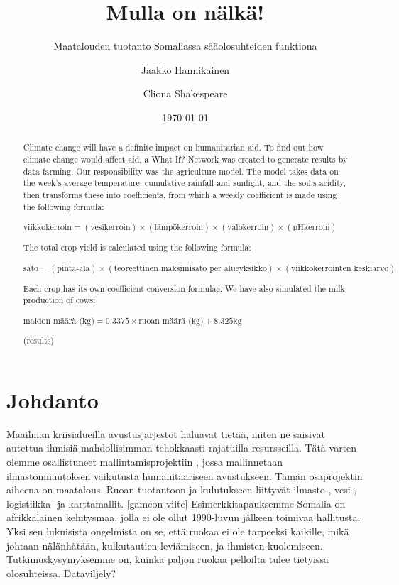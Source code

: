\documentclass[12pt]{scrreprt}
\title{Mulla on nälkä!}
\subtitle{Maatalouden tuotanto Somaliassa sääolosuhteiden funktiona}
\author{Jaakko Hannikainen \and Cliona Shakespeare}
\date{\today}
\begin{document}
  \maketitle

  \begin{abstract}
    Climate change will have a definite impact on humanitarian aid. To find out how climate change would affect aid, a What If? Network was created to generate results by data farming. Our responsibility was the agriculture model.
The model takes data on the week's average temperature, cumulative rainfall and sunlight, and the soil's acidity, then transforms these into coefficients, from which a weekly coefficient is made using the following formula:
  \begin{em}
  $ \text{viikkokerroin} = (\text{vesikerroin}) \times (\text{lämpökerroin})
  \times (\text{valokerroin}) \times (\text{pHkerroin}) $\end{em}

The total crop yield is calculated using the following formula:
  \begin{em}
  $ \text{sato} = (\text{pinta-ala}) \times (\text{teoreettinen maksimisato per
  alueyksikko}) \times (\text{viikkokerrointen keskiarvo}) $\end{em}

Each crop has its own coefficient conversion formulae.
We have also simulated the milk production of cows:
\begin{em}
  $ \text{maidon määrä (kg)} = 0.3375 \times \text{ruoan määrä (kg)}
  + 8.325\text{kg} $ \end{em}

(results)
  \end{abstract}

  \tableofcontents

  \chapter{Johdanto}

  
  Maailman kriisialueilla avustusjärjestöt haluavat tietää, miten ne saisivat 
  autettua ihmisiä mahdollisimman tehokkaasti rajatuilla resursseilla. Tätä 
  varten olemme osallistuneet mallintamisprojektiin \cite{scythe}, jossa mallinnetaan
  ilmastonmuutoksen vaikutusta humanitääriseen avustukseen. Tämän osaprojektin aiheena on maatalous. Ruoan tuotantoon ja kulutukseen liittyvät ilmasto-, vesi-, logistiikka- ja karttamallit. [gameon-viite]
Esimerkkitapauksemme Somalia on afrikkalainen kehitysmaa, jolla ei ole ollut 1990-luvun jälkeen toimivaa hallitusta. Yksi sen lukuisista ongelmista on se, että ruokaa ei ole tarpeeksi kaikille, mikä johtaan nälänhätään, kulkutautien leviämiseen, ja ihmisten kuolemiseen. 
Tutkimuskysymyksemme on, kuinka paljon ruokaa pelloilta tulee tietyissä olosuhteissa.
Dataviljely?
\end{document}
